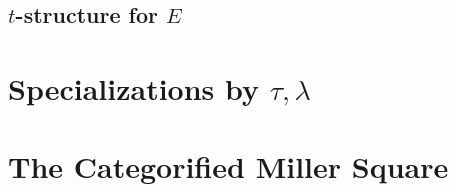   \subsection{$t$-structure for $E$}
  \label{E_tstruct_subsec}
  
  \section{Specializations by $\tau,\lambda$}
  
  \section{The Categorified Miller Square}